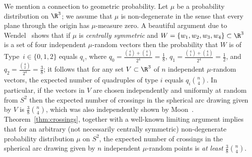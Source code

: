 %
\begin{remark} 
\label{rem:Wendel}
We mention a connection to geometric probability. Let $\mu$ be a probability distribution on $\R^3$; we assume that $\mu$ is non-degenerate  in the sense that every plane through the origin has $\mu$-measure zero. A beautiful argument due to Wendel~\cite{Wendel:1962aa} shows that if $\mu$ is \emph{centrally symmetric} and $W=\{w_1,w_2,w_3,w_4\} \subset \R^3$ is a set of four independent $\mu$-random vectors then the probability that $W$ is of Type~$i \in \{0,1,2\}$ equals $q_i$, where  $q_0=\frac{\binom{4}{0}+\binom{4}{4}}{2^4}=\frac{1}{8}$, $q_1=\frac{\binom{4}{1}+\binom{4}{3}}{2^4}=\frac{1}{2}$, and $q_2=\frac{\binom{4}{2}}{2^4}=\frac{3}{8}$;
 it follows that for any set $V\subset \R^3$ of $n$ independent $\mu$-random vectors, the expected number of quadruples of type $i$ equals $q_i \binom{n}{4}$.
 In particular, if the vectors in $V$ are chosen independently and uniformly at random from $S^2$ then the expected number of crossings in the spherical arc drawing given by $V$ is $\frac{3}{8}\binom{n}{4}$, which was also independently shown by Moon~\cite{Moon:1965aa}. Theorem~\ref{thm:crossings}, together with a well-known limiting argument \cite{Scheinerman:1994aa} implies that for an arbitrary (not necessarily centrally symmetric) non-degenerate probability distribution $\mu$ on $S^2$, the expected number of crossings in the spherical arc drawing given by $n$ independent 
 $\mu$-random points is \emph{at least} $\frac{3}{8}\binom{n}{4}$. 
\end{remark}
%
%
